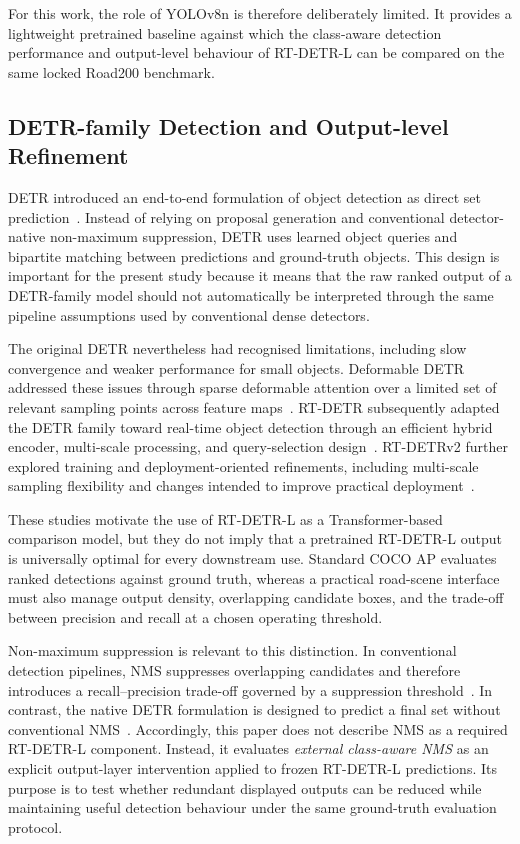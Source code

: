 \documentclass[runningheads]{llncs}
\begin{document}
For this work, the role of YOLOv8n is therefore deliberately limited. It provides a lightweight pretrained baseline against which the class-aware detection performance and output-level behaviour of RT-DETR-L can be compared on the same locked Road200 benchmark.

\subsection{DETR-family Detection and Output-level Refinement}

DETR introduced an end-to-end formulation of object detection as direct set prediction~\cite{carion2020detr}. Instead of relying on proposal generation and conventional detector-native non-maximum suppression, DETR uses learned object queries and bipartite matching between predictions and ground-truth objects. This design is important for the present study because it means that the raw ranked output of a DETR-family model should not automatically be interpreted through the same pipeline assumptions used by conventional dense detectors.

The original DETR nevertheless had recognised limitations, including slow convergence and weaker performance for small objects. Deformable DETR addressed these issues through sparse deformable attention over a limited set of relevant sampling points across feature maps~\cite{zhu2021deformable}. RT-DETR subsequently adapted the DETR family toward real-time object detection through an efficient hybrid encoder, multi-scale processing, and query-selection design~\cite{zhao2024detrsbeat}. RT-DETRv2 further explored training and deployment-oriented refinements, including multi-scale sampling flexibility and changes intended to improve practical deployment~\cite{lv2024rtdetrv2}.

These studies motivate the use of RT-DETR-L as a Transformer-based comparison model, but they do not imply that a pretrained RT-DETR-L output is universally optimal for every downstream use. Standard COCO AP evaluates ranked detections against ground truth, whereas a practical road-scene interface must also manage output density, overlapping candidate boxes, and the trade-off between precision and recall at a chosen operating threshold.

Non-maximum suppression is relevant to this distinction. In conventional detection pipelines, NMS suppresses overlapping candidates and therefore introduces a recall--precision trade-off governed by a suppression threshold~\cite{hosang2017learningnms}. In contrast, the native DETR formulation is designed to predict a final set without conventional NMS~\cite{carion2020detr}. Accordingly, this paper does not describe NMS as a required RT-DETR-L component. Instead, it evaluates \emph{external class-aware NMS} as an explicit output-layer intervention applied to frozen RT-DETR-L predictions. Its purpose is to test whether redundant displayed outputs can be reduced while maintaining useful detection behaviour under the same ground-truth evaluation protocol.
\end{document}
